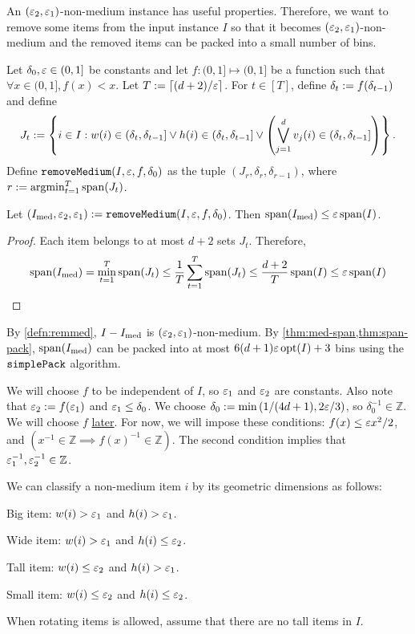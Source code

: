 An $(\varepsilon_2, \varepsilon_1)$-non-medium instance has useful properties.
Therefore, we want to remove some items from the input instance $I$
so that it becomes $(\varepsilon_2, \varepsilon_1)$-non-medium and the removed items
can be packed into a small number of bins.

\begin{definition}
\label{defn:remmed}
Let $\delta_0, \varepsilon \in (0, 1]$ be constants and let
$f: (0, 1] \mapsto (0, 1]$ be a function such that $\forall x \in (0, 1], f(x) < x$.
Let $T := \left\lceil (d+2)/\varepsilon \right\rceil$.
For $t \in [T]$, define $\delta_t := f(\delta_{t-1})$ and define
\[ J_t := \left\{i \in I: w(i) \in (\delta_t,\delta_{t-1}] \vee h(i) \in (\delta_t,\delta_{t-1}]
    \vee \left(\bigvee_{j=1}^d v_j(i) \in (\delta_t,\delta_{t-1}]\right)\right\}. \]
Define $\operatorname{\mathtt{removeMedium}}(I, \varepsilon, f, \delta_0)$ as the tuple $(J_r, \delta_r, \delta_{r-1})$,
where $r := \operatorname*{argmin}_{t=1}^T \operatorname{span}(J_t)$.
\end{definition}

\begin{lemma}
\label{thm:med-span}
Let $(I_{\mathrm{med}}, \varepsilon_2, \varepsilon_1) := \operatorname{\mathtt{removeMedium}}(I, \varepsilon, f, \delta_0)$.
Then $\operatorname{span}(I_{\mathrm{med}}) \le \varepsilon\operatorname{span}(I)$.
\end{lemma}
\begin{proof}
Each item belongs to at most $d+2$ sets $J_t$. Therefore,
\[ \operatorname{span}(I_{\mathrm{med}}) = \min_{t=1}^T \operatorname{span}(J_t)
\le \frac{1}{T} \sum_{t=1}^T \operatorname{span}(J_t)
\le \frac{d+2}{T} \operatorname{span}(I)
\le \varepsilon \operatorname{span}(I) \qedhere \]
\end{proof}
By \cref{defn:remmed}, $I - I_{\mathrm{med}}$ is $(\varepsilon_2, \varepsilon_1)$-non-medium.
By \cref{thm:med-span,thm:span-pack}, $\operatorname{span}(I_{\mathrm{med}})$ can be packed into
at most $6(d+1)\varepsilon\operatorname{opt}(I) + 3$ bins using the $\operatorname{\mathtt{simplePack}}$ algorithm.

We will choose $f$ to be independent of $I$, so $\varepsilon_1$ and $\varepsilon_2$ are constants.
Also note that $\varepsilon_2 := f(\varepsilon_1)$ and $\varepsilon_1 \le \delta_0$.
We choose ${\delta_0 := \min\left(1/(4d+1), 2\varepsilon/3\right) }$,
so $\delta_0^{-1} \in \mathbb{Z}$.
We will choose $f$ \hyperref[eqn:remmed-f]{later}. For now, we will impose these conditions:
$f(x) \le \varepsilon x^2/2$, and $(x^{-1} \in \mathbb{Z} \implies f(x)^{-1} \in \mathbb{Z})$.
The second condition implies that $\varepsilon_1^{-1}, \varepsilon_2^{-1} \in \mathbb{Z}$.

\begin{definition}
We can classify a non-medium item $i$ by its geometric dimensions as follows:
\begin{tightemize}
\item Big item: $w(i) > \varepsilon_1$ and $h(i) > \varepsilon_1$.
\item Wide item: $w(i) > \varepsilon_1$ and $h(i) \le \varepsilon_2$.
\item Tall item: $w(i) \le \varepsilon_2$ and $h(i) > \varepsilon_1$.
\item Small item: $w(i) \le \varepsilon_2$ and $h(i) \le \varepsilon_2$.
\end{tightemize}
\end{definition}
When rotating items is allowed, assume \wLoG{} that there are no tall items in $I$.

